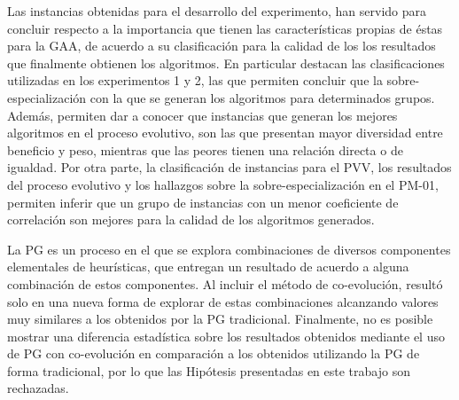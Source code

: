 Las instancias obtenidas para el desarrollo del experimento, han servido para concluir respecto a la importancia que tienen las características propias de éstas para la GAA, de acuerdo a su clasificación para la calidad de los los resultados que finalmente obtienen los algoritmos. En particular destacan las clasificaciones utilizadas en los experimentos 1 y 2, las que permiten concluir que la sobre-especialización con la que se generan los algoritmos para determinados grupos. Además, permiten dar a conocer que instancias que generan los mejores algoritmos en el proceso evolutivo, son las que presentan mayor diversidad entre beneficio y peso, mientras que las peores tienen una relación directa o de igualdad. Por otra parte, la clasificación de instancias para el PVV, los resultados del proceso evolutivo y los hallazgos sobre la sobre-especialización en el PM-01, permiten inferir que un grupo de instancias con un menor coeficiente de correlación son mejores para la calidad de los algoritmos generados.

La PG es un proceso en el que se explora combinaciones de diversos componentes elementales de heurísticas, que entregan un resultado de acuerdo a alguna combinación de estos componentes. Al incluir el método de co-evolución, resultó solo en una nueva forma de explorar de estas combinaciones alcanzando valores muy similares a los obtenidos por la PG tradicional. Finalmente, no es posible mostrar una diferencia estadística sobre los resultados obtenidos mediante el uso de PG con co-evolución en comparación a los obtenidos utilizando la PG de forma tradicional, por lo que las Hipótesis presentadas en este trabajo son rechazadas.

